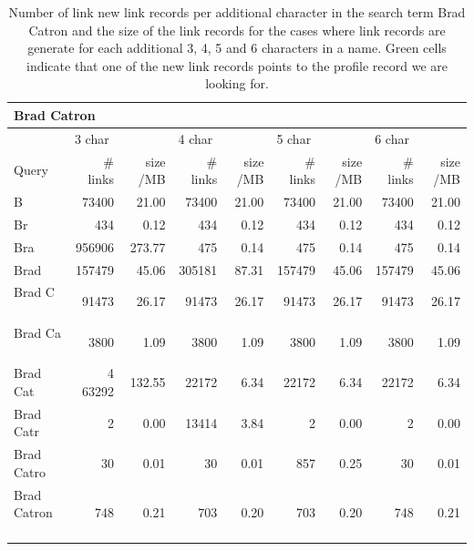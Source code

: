 \begin{table}[!htb]
\caption{Number of link new link records per additional character in the search term Brad Catron and the size of the link records for the cases where link records are generate for each additional 3, 4, 5 and 6 characters in a name. Green cells indicate that one of the new link records points to the profile record we are looking for.}
\begin{center}
\scriptsize{
  \begin{tabular}{ | l | r | r | r | r | r | r | r | r | }
    \hline                       
    \multicolumn{9}{|l|}{\textbf{Brad Catron}} \\ 
    \hline                       
    \hline  
    & \multicolumn{2}{l|}{3 char} & \multicolumn{2}{l|}{4 char} & \multicolumn{2}{l|}{5 char} & \multicolumn{2}{l|}{6 char}  \\
    Query & \# links & size /MB & \# links & size /MB & \# links & size /MB & \# links & size /MB  \\
    \hline  
    B                & 73400 & 21.00 & 73400 & 21.00 & 73400 & 21.00 & 73400 & 21.00 \\
    \hline
    Br               & 434 & 0.12 & 434 & 0.12 & 434 & 0.12 & 434 & 0.12 \\
    \hline
    Bra              & \cellcolor{green} 956906 & 273.77 & 475 & 0.14 & 475 & 0.14 & 475 & 0.14 \\
    \hline
    Brad             & \cellcolor{green} 157479 & 45.06 & \cellcolor{green} 305181 & 87.31 & \cellcolor{green} 157479 & 45.06 & \cellcolor{green} 157479 & 45.06 \\
    \hline
    Brad C           & 91473 & 26.17 & 91473 & 26.17 & 91473 & 26.17 & 91473 & 26.17 \\
    \hline
    Brad Ca          & 3800 & 1.09 & 3800 & 1.09 & 3800 & 1.09 & 3800 & 1.09 \\
    \hline
    Brad Cat         & 4\cellcolor{green} 63292 & 132.55 & 22172 & 6.34 & 22172 & 6.34 & 22172 & 6.34 \\
    \hline
    Brad Catr        & 2 & 0.00 & \cellcolor{green} 13414 & 3.84 & 2 & 0.00 & 2 & 0.00 \\
    \hline
    Brad Catro       & 30 & 0.01 & 30 & 0.01 & \cellcolor{green} 857 & 0.25 & 30 & 0.01 \\
    \hline
    Brad Catron      & \cellcolor{green} 748 & 0.21 & \cellcolor{green} 703 & 0.20 & \cellcolor{green} 703 & 0.20 & \cellcolor{green} 748 & 0.21 \\
    \hline  
  \end{tabular}
}
\end{center}
\label{tableAmericanName}
\end{table}

